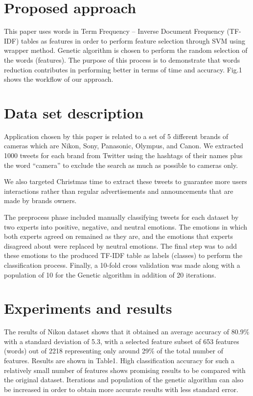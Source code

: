 \documentclass[runningheads,a4paper]{llncs}
\begin{document}
\section{Proposed approach}
	\label{PSORF}
	
	This paper uses words in Term Frequency – Inverse Document Frequency (TF-IDF) tables as features in order to perform feature selection through SVM using wrapper method. Genetic algorithm is chosen to perform the random selection of the words (features). The purpose of this process is to demonstrate that words reduction contributes in performing better in terms of time and accuracy. Fig.1 shows the workflow of our approach.


\section{Data set description}
\label{data}

Application chosen by this paper is related to a set of 5 different brands of cameras which are Nikon, Sony, Panasonic, Olympus, and Canon. We extracted 1000 tweets for each brand from Twitter using the hashtags of their names plus the word “camera” to exclude the search as much as possible to cameras only.


We also targeted Christmas time to extract these tweets to guarantee more users interactions rather than regular advertisements and announcements that are made by brands owners.

The preprocess phase included manually classifying tweets for each dataset by two experts into positive, negative, and neutral emotions. The emotions in which both experts agreed on remained as they are, and the emotions that experts disagreed about were replaced by neutral emotions. The final step was to add these emotions to the produced TF-IDF table as labels (classes) to perform the classification process.
Finally, a 10-fold cross validation was made along with a population of 10 for the Genetic algorithm in addition of 20 iterations.



\section{Experiments and results}
\label{experiments}
The results of Nikon dataset shows that it obtained an average accuracy of 80.9\% with a standard deviation of 5.3, with a selected feature subset of 653 features (words) out of 2218 representing only around 29\% of the total number of features. Results are shown in Table1.
High classification accuracy for such a relatively small number of features shows promising results to be compared with the original dataset. Iterations and population of the genetic algorithm can also be increased in order to obtain more accurate results with less standard error.
\end{document}
